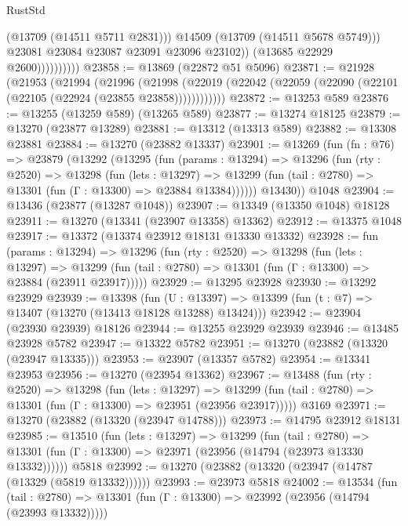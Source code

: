 \begin{lexlean}{RustStd}
\begin{coremodule}
                              (@13709 (@14511 @5711 @2831)))
                            @14509
                            (@13709 (@14511 @5678 @5749)))
                          @23081
                          @23084
                          @23087
                          @23091
                          @23096
                          @23102))
                      (@13685 @22929 @2600))))))))))
@23858 := @13869 (@22872 @51 @5096)
@23871 := @21928
    (@21953
      (@21994
        (@21996
          (@21998 (@22019 (@22042 (@22059 (@22090 (@22101 (@22105 (@22924 (@23855 @23858))))))))))))
@23872 := @13253 @589
@23876 := @13255 (@13259 @589) (@13265 @589)
@23877 := @13274 @18125
@23879 := @13270 (@23877 @13289)
@23881 := @13312 (@13313 @589)
@23882 := @13308 @23881
@23884 := @13270 (@23882 @13337)
@23901 := @13269
    (fun (fn : @76) =>
    @23879
      (@13292
        (@13295
          (fun (params : @13294) =>
          @13296
            (fun (rty : @2520) =>
            @13298
              (fun (lets : @13297) =>
              @13299 (fun (tail : @2780) => @13301 (fun (Γ : @13300) => @23884 @13384))))))
        @13430))
    @1048
@23904 := @13436 (@23877 (@13287 @1048))
@23907 := @13349 (@13350 @1048) @18128
@23911 := @13270 (@13341 (@23907 @13358) @13362)
@23912 := @13375 @1048
@23917 := @13372 (@13374 @23912 @18131 @13330 @13332)
@23928 := fun (params : @13294) =>
  @13296
    (fun (rty : @2520) =>
    @13298
      (fun (lets : @13297) =>
      @13299 (fun (tail : @2780) => @13301 (fun (Γ : @13300) => @23884 (@23911 @23917)))))
@23929 := @13295 @23928
@23930 := @13292 @23929
@23939 := @13398
    (fun (U : @13397) => @13399 (fun (t : @7) => @13407 (@13270 (@13413 @18128 @13288) @13424)))
@23942 := @23904 (@23930 @23939) @18126
@23944 := @13255 @23929 @23939
@23946 := @13485 @23928 @5782
@23947 := @13322 @5782
@23951 := @13270 (@23882 (@13320 (@23947 @13335)))
@23953 := @23907 (@13357 @5782)
@23954 := @13341 @23953
@23956 := @13270 (@23954 @13362)
@23967 := @13488
    (fun (rty : @2520) =>
    @13298
      (fun (lets : @13297) =>
      @13299 (fun (tail : @2780) => @13301 (fun (Γ : @13300) => @23951 (@23956 @23917)))))
    @3169
@23971 := @13270 (@23882 (@13320 (@23947 @14788)))
@23973 := @14795 @23912 @18131
@23985 := @13510
    (fun (lets : @13297) =>
    @13299
      (fun (tail : @2780) =>
      @13301 (fun (Γ : @13300) => @23971 (@23956 (@14794 (@23973 @13330 @13332))))))
    @5818
@23992 := @13270 (@23882 (@13320 (@23947 (@14787 (@13329 (@5819 @13332))))))
@23993 := @23973 @5818
@24002 := @13534
    (fun (tail : @2780) => @13301 (fun (Γ : @13300) => @23992 (@23956 (@14794 (@23993 @13332)))))

\end{coremodule}
\end{lexlean}

